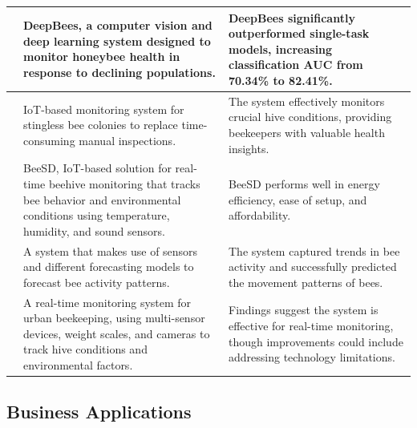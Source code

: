 \documentclass[12pt]{article}
\begin{document}
\begin{table}[H]
{\begin{tabular}{|>{\centering\arraybackslash}m{2 cm}|m{6 cm}|m{6 cm}|}
				{\cite{marstaller2019deepbees}} & DeepBees, a computer vision and deep learning system designed to monitor honeybee health in response to declining populations. & DeepBees significantly outperformed single-task models, increasing classification AUC from 70.34\% to 82.41\%. \\ \hline
				
				{\cite{rosli2022iot}} & IoT-based monitoring system for stingless bee colonies to replace time-consuming manual inspections. & The system effectively monitors crucial hive conditions, providing beekeepers with valuable health insights. \\ \hline
				
				{\cite{kiromitis2022bee}} & BeeSD, IoT-based solution for real-time beehive monitoring that tracks bee behavior and environmental conditions using temperature, humidity, and sound sensors. & BeeSD performs well in energy efficiency, ease of setup, and affordability. \\ \hline
				
				{\cite{andrijevic2022iot}} & A system that makes use of sensors and different forecasting models to forecast bee activity patterns. & The system captured trends in bee activity and successfully predicted the movement patterns of bees. \\ \hline
				
				{\cite{szczurek2023monitoring}} & A real-time monitoring system for urban beekeeping, using multi-sensor devices, weight scales, and cameras to track hive conditions and environmental factors. & Findings suggest the system is effective for real-time monitoring, though improvements could include addressing technology limitations. \\ \hline
				
			\end{tabular}%
		}
		\label{tab:SUMMARY}
	\end{table}
	\subsection{Business Applications}
	
\end{document}
